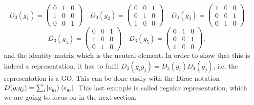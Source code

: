 \documentclass[12pt]{book}
\theoremstyle{plain}
\theoremstyle{definition}
\theoremstyle{remark}
\begin{document}
\begin{itemize}
\[D_3(g_1) = \begin{pmatrix}
  0 & 1 & 0\\
  1 & 0 & 0\\
  0 & 0 & 1 
 \end{pmatrix} \quad D_3(g_2) = \begin{pmatrix}
  0 & 0 & 1\\
  0 & 1 & 0\\
  1 & 0 &0 
 \end{pmatrix}\quad D_3(g_3) = \begin{pmatrix}
  1 & 0 & 0\\
  0 & 0 & 1\\
  0 & 1 &0 
 \end{pmatrix}\]
 \[D_3(g_4) = \begin{pmatrix}
  0 & 0 & 1\\
  1 & 0 & 0\\
  0 & 1 &0 
 \end{pmatrix}\quad D_3(g_5) = \begin{pmatrix}
  0 & 1 & 0\\
  0 & 0 & 1\\
  1 & 0 &0 
 \end{pmatrix},\]
 and the identity matrix which is the neutral element. In order to show that this is indeed a representation, it has to fulfil $D_3(g_ig_j) = D_3(g_i)D_3(g_j)$, i.e. the representation is a GO. This can be done easily with the Dirac notation $D(g_ig_j) = \sum_i \ket{e_{g_i}}\bra{e_{g_i}}$. This last example is called regular representation, which we are going to focus on in the next section.
\end{itemize}
\end{document}
